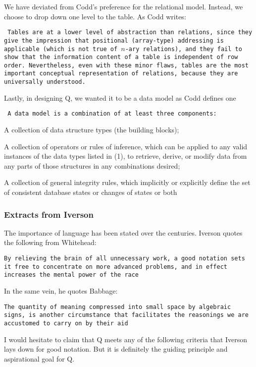 \documentclass{report}
\begin{document}
We have deviated from Codd's preference for the relational model.
Instead, we choose to drop down one level to the table. As Codd writes:

{\tt 
  Tables are at a lower level of abstraction than relations, since they
    give the impression that positional (array-type) addressing is
    applicable (which is not true of \(n\)-ary relations), and they fail
    to show that the information content of a table is independent of
    row order. Nevertheless, even with these minor flaws, tables are the
    most important conceptual representation of relations, because they
    are universally understood.

}

Lastly, in designing Q, we wanted it to be a data model as Codd defines
one

{\tt
A data model is a combination of at least three components:
  \be
  \item A collection of data structure types (the building blocks);
\item A collection of operators or rules of inference, which can be
  applied to any valid instances of the data types listed in (1), to
  retrieve, derive, or modify data from any parts of those structures in
  any combinations desired;
\item A collection of general  integrity rules, which implicitly or
  explicitly define the set of consistent database states or changes of
  states or both
  \ee

}

\subsubsection{Extracts from Iverson}

The importance of language has been stated over the centuries. Iverson
quotes the following from Whitehead:

{\tt By relieving the brain of all unnecessary work, a good notation
  sets it free to concentrate on more advanced problems, and in effect
    increases the mental power of the race}

In the same vein, he quotes Babbage:

{\tt The quantity of meaning compressed into small space by algebraic
  signs, is another circumstance that facilitates the reasonings we are
    accustomed to carry on by their aid}

I would hesitate to claim that Q meets any of the following criteria
that Iverson lays down for good notation. But it is  definitely the
guiding principle and aspirational goal for Q.
\end{document}
